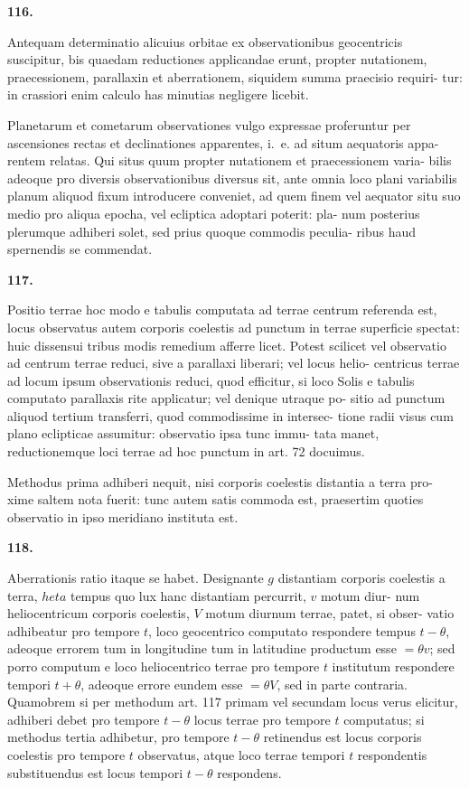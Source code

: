 \documentclass[12pt,a4paper]{article}
\begin{document}
\bigskip
\noindent\textbf{116.}

Antequam determinatio alicuius orbitae ex observationibus geocentricis
suscipitur, bis quaedam reductiones applicandae erunt, propter nutationem,
praecessionem, parallaxin et aberrationem, siquidem summa praecisio requiri-
tur: in crassiori enim calculo has minutias negligere licebit.

Planetarum et cometarum observationes vulgo expressae proferuntur per
ascensiones rectas et declinationes apparentes, i.~e. ad situm aequatoris appa-
rentem relatas. Qui situs quum propter nutationem et praecessionem varia-
bilis adeoque pro diversis observationibus diversus sit, ante omnia loco plani
variabilis planum aliquod fixum introducere conveniet, ad quem finem vel
aequator situ suo medio pro aliqua epocha, vel ecliptica adoptari poterit: pla-
num posterius plerumque adhiberi solet, sed prius quoque commodis peculia-
ribus haud spernendis se commendat.

\bigskip
\noindent\textbf{117.}

Positio terrae hoc modo e tabulis computata ad terrae centrum referenda
est, locus observatus autem corporis coelestis ad punctum in terrae superficie
spectat: huic dissensui tribus modis remedium afferre licet. Potest scilicet vel
observatio ad centrum terrae reduci, sive a parallaxi liberari; vel locus helio-
centricus terrae ad locum ipsum observationis reduci, quod efficitur, si loco
Solis e tabulis computato parallaxis rite applicatur; vel denique utraque po-
sitio ad punctum aliquod tertium transferri, quod commodissime in intersec-
tione radii visus cum plano eclipticae assumitur: observatio ipsa tunc immu-
tata manet, reductionemque loci terrae ad hoc punctum in art. 72 docuimus.

Methodus prima adhiberi nequit, nisi corporis coelestis distantia a terra pro-
xime saltem nota fuerit: tunc autem satis commoda est, praesertim quoties
observatio in ipso meridiano instituta est.


\bigskip
\noindent\textbf{118.}

Aberrationis ratio itaque se habet. Designante $g$ distantiam corporis
coelestis a terra, $	heta$ tempus quo lux hanc distantiam percurrit, $v$ motum diur-
num heliocentricum corporis coelestis, $V$ motum diurnum terrae, patet, si obser-
vatio adhibeatur pro tempore $t$, loco geocentrico computato respondere tempus
$t - \theta$, adeoque errorem tum in longitudine tum in latitudine productum esse
$= \theta v$; sed porro computum e loco heliocentrico terrae pro tempore $t$ institutum
respondere tempori $t + \theta$, adeoque errore eundem esse $= \theta V$, sed in parte
contraria. Quamobrem si per methodum art. 117 primam vel secundam locus
verus elicitur, adhiberi debet pro tempore $t - \theta$ locus terrae pro tempore $t$
computatus; si methodus tertia adhibetur, pro tempore $t - \theta$ retinendus est
locus corporis coelestis pro tempore $t$ observatus, atque loco terrae tempori $t$
respondentis substituendus est locus tempori $t - \theta$ respondens.
\end{document}
